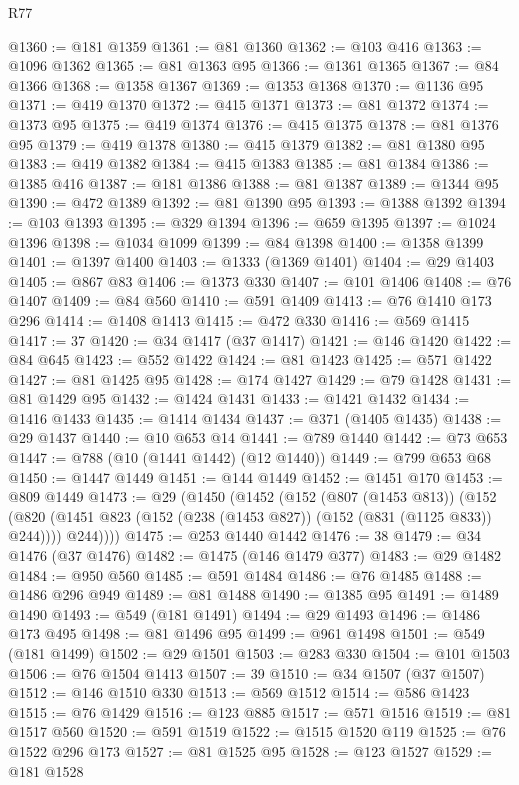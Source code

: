 \begin{lexlean}{R77}
\begin{coremodule}
@1360 := @181 @1359
@1361 := @81 @1360
@1362 := @103 @416
@1363 := @1096 @1362
@1365 := @81 @1363 @95
@1366 := @1361 @1365
@1367 := @84 @1366
@1368 := @1358 @1367
@1369 := @1353 @1368
@1370 := @1136 @95
@1371 := @419 @1370
@1372 := @415 @1371
@1373 := @81 @1372
@1374 := @1373 @95
@1375 := @419 @1374
@1376 := @415 @1375
@1378 := @81 @1376 @95
@1379 := @419 @1378
@1380 := @415 @1379
@1382 := @81 @1380 @95
@1383 := @419 @1382
@1384 := @415 @1383
@1385 := @81 @1384
@1386 := @1385 @416
@1387 := @181 @1386
@1388 := @81 @1387
@1389 := @1344 @95
@1390 := @472 @1389
@1392 := @81 @1390 @95
@1393 := @1388 @1392
@1394 := @103 @1393
@1395 := @329 @1394
@1396 := @659 @1395
@1397 := @1024 @1396
@1398 := @1034 @1099
@1399 := @84 @1398
@1400 := @1358 @1399
@1401 := @1397 @1400
@1403 := @1333 (@1369 @1401)
@1404 := @29 @1403
@1405 := @867 @83
@1406 := @1373 @330
@1407 := @101 @1406
@1408 := @76 @1407
@1409 := @84 @560
@1410 := @591 @1409
@1413 := @76 @1410 @173 @296
@1414 := @1408 @1413
@1415 := @472 @330
@1416 := @569 @1415
@1417 := 37
@1420 := @34 @1417 (@37 @1417)
@1421 := @146 @1420
@1422 := @84 @645
@1423 := @552 @1422
@1424 := @81 @1423
@1425 := @571 @1422
@1427 := @81 @1425 @95
@1428 := @174 @1427
@1429 := @79 @1428
@1431 := @81 @1429 @95
@1432 := @1424 @1431
@1433 := @1421 @1432
@1434 := @1416 @1433
@1435 := @1414 @1434
@1437 := @371 (@1405 @1435)
@1438 := @29 @1437
@1440 := @10 @653 @14
@1441 := @789 @1440
@1442 := @73 @653
@1447 := @788 (@10 (@1441 @1442) (@12 @1440))
@1449 := @799 @653 @68
@1450 := @1447 @1449
@1451 := @144 @1449
@1452 := @1451 @170
@1453 := @809 @1449
@1473 := @29
    (@1450
      (@1452
        (@152
          (@807 (@1453 @813))
          (@152
            (@820 (@1451 @823 (@152 (@238 (@1453 @827)) (@152 (@831 (@1125 @833)) @244))))
            @244))))
@1475 := @253 @1440 @1442
@1476 := 38
@1479 := @34 @1476 (@37 @1476)
@1482 := @1475 (@146 @1479 @377)
@1483 := @29 @1482
@1484 := @950 @560
@1485 := @591 @1484
@1486 := @76 @1485
@1488 := @1486 @296 @949
@1489 := @81 @1488
@1490 := @1385 @95
@1491 := @1489 @1490
@1493 := @549 (@181 @1491)
@1494 := @29 @1493
@1496 := @1486 @173 @495
@1498 := @81 @1496 @95
@1499 := @961 @1498
@1501 := @549 (@181 @1499)
@1502 := @29 @1501
@1503 := @283 @330
@1504 := @101 @1503
@1506 := @76 @1504 @1413
@1507 := 39
@1510 := @34 @1507 (@37 @1507)
@1512 := @146 @1510 @330
@1513 := @569 @1512
@1514 := @586 @1423
@1515 := @76 @1429
@1516 := @123 @885
@1517 := @571 @1516
@1519 := @81 @1517 @560
@1520 := @591 @1519
@1522 := @1515 @1520 @119
@1525 := @76 @1522 @296 @173
@1527 := @81 @1525 @95
@1528 := @123 @1527
@1529 := @181 @1528

\end{coremodule}
\end{lexlean}

